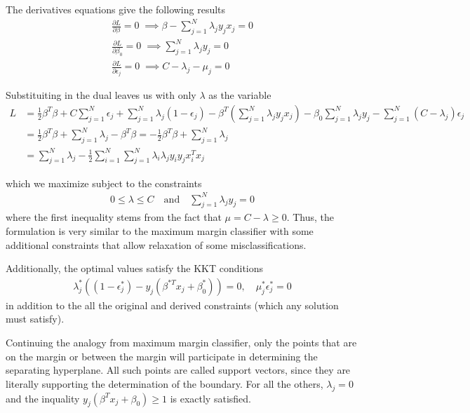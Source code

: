 \documentclass[../statistical_learning_notes.tex]{subfiles}
\begin{document}
    The derivatives equations give the following results
    \begin{gather*}
        \frac{\partial L}{\partial \beta} = 0 \; \implies \beta - \sum_{j=1}^{N}\lambda_{j}y_{j}x_{j} = 0\\
        \frac{\partial L}{\partial \beta_{0}} = 0 \; \implies \sum_{j=1}^{N} \lambda_{j}y_{j} = 0\\
        \frac{\partial L}{\partial \epsilon_{j}} = 0 \; \implies C - \lambda_{j} - \mu_{j} = 0
    \end{gather*}

    Substituiting in the dual leaves us with only $\lambda$ as the variable
    \begin{align*}
        L &= \frac{1}{2}\beta^{T}\beta + C\sum_{j=1}^{N}\epsilon_{j} + \sum_{j=1}^{N}\lambda_{j}(1 - \epsilon_{j}) - \beta^{T}(\sum_{j=1}^{N} \lambda_{j}y_{j}x_{j}) - \beta_{0}\sum_{j=1}^{N}\lambda_{j}y_{j} - \sum_{j=1}^{N}(C - \lambda_{j})\epsilon_{j}\\
        &= \frac{1}{2}\beta^{T}\beta + \sum_{j=1}^{N}\lambda_{j} -\beta^{T}\beta = -\frac{1}{2}\beta^{T}\beta + \sum_{j=1}^{N}\lambda_{j}\\
        &= \sum_{j=1}^{N}\lambda_{j} - \frac{1}{2} \sum_{i=1}^{N}\sum_{j=1}^{N} \lambda_{i}\lambda_{j}y_{i}y_{j}x_{i}^{T}x_{j}
    \end{align*}

    which we maximize subject to the constraints
    \begin{gather*}
        0 \leq \lambda \leq C \quad \text{and} \quad \sum_{j=1}^{N}\lambda_{j}y_{j} = 0
    \end{gather*}
    where the first inequality stems from the fact that $\mu = C - \lambda \geq 0$. Thus, the formulation is very similar to the maximum margin classifier with some additional constraints that allow relaxation of some misclassifications.\newline

    Additionally, the optimal values satisfy the KKT conditions
    \begin{align*}
        \lambda_{j}^{*}((1 - \epsilon^{*}_{j}) - y_{j}(\beta^{*T}x_{j} + \beta_{0}^{*})) = 0, \quad \mu_{j}^{*}\epsilon_{j}^{*} = 0
    \end{align*}
    in addition to the all the original and derived constraints (which any solution must satisfy).\newline

    Continuing the analogy from maximum margin classifier, only the points that are on the margin or between the margin will participate in determining the separating hyperplane. All such points are called support vectors, since they are literally supporting the determination of the boundary. For all the others, $\lambda_{j} = 0$ and the inquality $y_{j}(\beta^{T}x_{j} + \beta_{0}) \geq 1$ is exactly satisfied.
\end{document}
